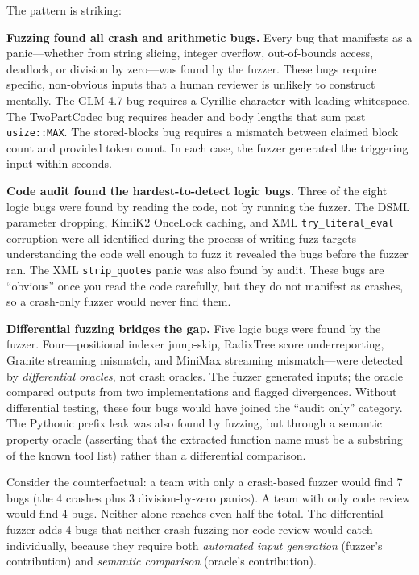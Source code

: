 The pattern is striking:

\textbf{Fuzzing found all crash and arithmetic bugs.} Every bug that manifests as a panic---whether from string slicing, integer overflow, out-of-bounds access, deadlock, or division by zero---was found by the fuzzer. These bugs require specific, non-obvious inputs that a human reviewer is unlikely to construct mentally. The GLM-4.7 bug requires a Cyrillic character with leading whitespace. The TwoPartCodec bug requires header and body lengths that sum past \texttt{usize::MAX}. The stored-blocks bug requires a mismatch between claimed block count and provided token count. In each case, the fuzzer generated the triggering input within seconds.

\textbf{Code audit found the hardest-to-detect logic bugs.} Three of the eight logic bugs were found by reading the code, not by running the fuzzer. The DSML parameter dropping, KimiK2 OnceLock caching, and XML \texttt{try\_literal\_eval} corruption were all identified during the process of writing fuzz targets---understanding the code well enough to fuzz it revealed the bugs before the fuzzer ran. The XML \texttt{strip\_quotes} panic was also found by audit. These bugs are ``obvious'' once you read the code carefully, but they do not manifest as crashes, so a crash-only fuzzer would never find them.

\textbf{Differential fuzzing bridges the gap.} Five logic bugs were found by the fuzzer. Four---positional indexer jump-skip, RadixTree score underreporting, Granite streaming mismatch, and MiniMax streaming mismatch---were detected by \emph{differential oracles}, not crash oracles. The fuzzer generated inputs; the oracle compared outputs from two implementations and flagged divergences. Without differential testing, these four bugs would have joined the ``audit only'' category. The Pythonic prefix leak was also found by fuzzing, but through a semantic property oracle (asserting that the extracted function name must be a substring of the known tool list) rather than a differential comparison.

Consider the counterfactual: a team with only a crash-based fuzzer would find 7 bugs (the 4 crashes plus 3 division-by-zero panics). A team with only code review would find 4 bugs. Neither alone reaches even half the total. The differential fuzzer adds 4 bugs that neither crash fuzzing nor code review would catch individually, because they require both \emph{automated input generation} (fuzzer's contribution) and \emph{semantic comparison} (oracle's contribution).

